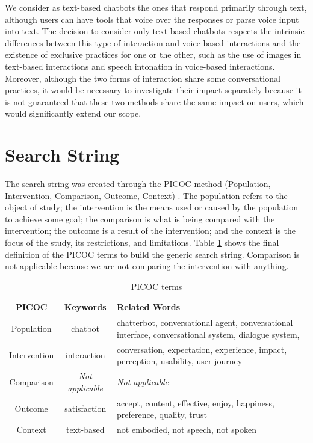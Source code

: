 We consider as text-based chatbots the ones that respond primarily through text, although users can have tools that voice over the responses or parse voice input into text. The decision to consider only text-based chatbots respects the intrinsic differences between this type of interaction and voice-based interactions and the existence of exclusive practices for one or the other, such as the use of images in text-based interactions and speech intonation in voice-based interactions. Moreover, although the two forms of interaction share some conversational practices, it would be necessary to investigate their impact separately because it is not guaranteed that these two methods share the same impact on users, which would significantly extend our scope.


\section{Search String}
 
The search string was created through the PICOC method (Population, Intervention, Comparison, Outcome, Context) \cite{Wohlin2012}. The population refers to the object of study; the intervention is the means used or caused by the population to achieve some goal; the comparison is what is being compared with the intervention; the outcome is a result of the intervention; and the context is the focus of the study, its restrictions, and limitations. Table \ref{tab:picoc} shows the final definition of the PICOC terms to build the generic search string. Comparison is not applicable because we are not comparing the intervention with anything.

\begin{table}[htbp]
  \centering
  \caption{PICOC terms}
  \label{tab:picoc}
  \begin{tabular}{ccp{9cm}}
    \hline
    PICOC & Keywords & Related Words \\
    \hline
    Population & chatbot &	
    chatterbot,  
    conversational agent,  
    conversational interface,  
    conversational system,  
    dialogue system,   \\
    Intervention  &interaction 	&
    conversation,  
    expectation,  
    experience,  
    impact,  
    perception,  
    usability,  
    user journey \\
    Comparison & \textit{Not applicable} & \textit{Not applicable} \\
    Outcome & satisfaction 	&
    accept,  
    content,  
    effective,  
    enjoy,  
    happiness,  
    preference,  
    quality,  
    trust \\
    Context & text-based & 
        not embodied,   not speech,   not spoken  \\
  \hline
\end{tabular}
\end{table}

